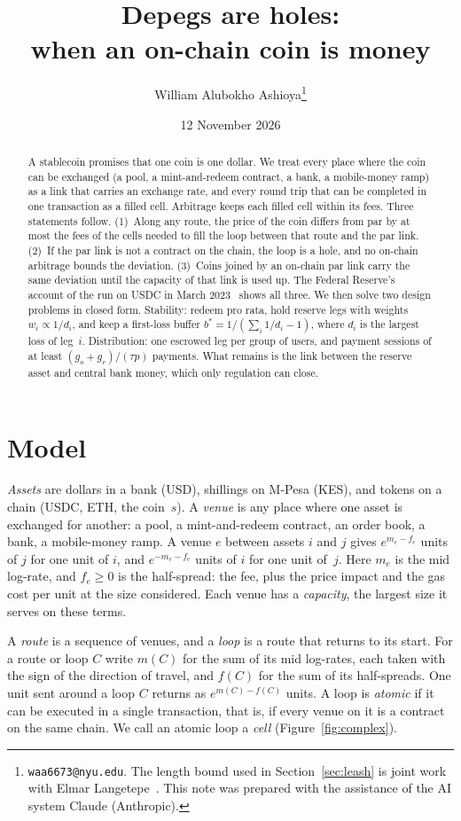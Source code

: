 \documentclass[11pt]{article}
\title{Depegs are holes:\\ when an on-chain coin is money}
\author{William Alubokho Ashioya\thanks{\texttt{waa6673@nyu.edu}. The length bound used in Section~\ref{sec:leash} is joint work with Elmar Langetepe~\cite{LA}. This note was prepared with the assistance of the AI system Claude (Anthropic).}}
\date{12 November 2026}
\theoremstyle{definition}
\theoremstyle{remark}
\begin{document}
\maketitle

\begin{abstract}
A stablecoin promises that one coin is one dollar. We treat every place where the coin can be exchanged (a pool, a mint-and-redeem contract, a bank, a mobile-money ramp) as a link that carries an exchange rate, and every round trip that can be completed in one transaction as a filled cell. Arbitrage keeps each filled cell within its fees. Three statements follow. (1)~Along any route, the price of the coin differs from par by at most the fees of the cells needed to fill the loop between that route and the par link. (2)~If the par link is not a contract on the chain, the loop is a hole, and no on-chain arbitrage bounds the deviation. (3)~Coins joined by an on-chain par link carry the same deviation until the capacity of that link is used up. The Federal Reserve's account of the run on USDC in March 2023~\cite{Fed} shows all three. We then solve two design problems in closed form. Stability: redeem pro rata, hold reserve legs with weights $w_i\propto1/d_i$, and keep a first-loss buffer $b^*=1/(\sum_i 1/d_i-1)$, where $d_i$ is the largest loss of leg~$i$. Distribution: one escrowed leg per group of users, and payment sessions of at least $(g_o+g_r)/(\tau p)$ payments. What remains is the link between the reserve asset and central bank money, which only regulation can close.
\end{abstract}

\section{Model}

\emph{Assets} are dollars in a bank (USD), shillings on M-Pesa (KES), and tokens on a chain (USDC, ETH, the coin~$s$). A \emph{venue} is any place where one asset is exchanged for another: a pool, a mint-and-redeem contract, an order book, a bank, a mobile-money ramp. A venue $e$ between assets $i$ and $j$ gives $e^{m_e-f_e}$ units of $j$ for one unit of $i$, and $e^{-m_e-f_e}$ units of $i$ for one unit of~$j$. Here $m_e$ is the mid log-rate, and $f_e\ge0$ is the half-spread: the fee, plus the price impact and the gas cost per unit at the size considered. Each venue has a \emph{capacity}, the largest size it serves on these terms.

A \emph{route} is a sequence of venues, and a \emph{loop} is a route that returns to its start. For a route or loop $C$ write $m(C)$ for the sum of its mid log-rates, each taken with the sign of the direction of travel, and $f(C)$ for the sum of its half-spreads. One unit sent around a loop $C$ returns as $e^{m(C)-f(C)}$ units. A loop is \emph{atomic} if it can be executed in a single transaction, that is, if every venue on it is a contract on the same chain. We call an atomic loop a \emph{cell} (Figure~\ref{fig:complex}).
\end{document}
